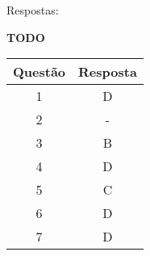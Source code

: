 \documentclass[12pt]{article}
\begin{document}
Respostas:

\textbf{TODO}

\begin{table}[H]
      \begin{tabular}{|c|c|} \hline
      \textbf{Questão} & \textbf{Resposta}\\
      \hline
      1  & D \\ \hline
      2  & - \\ \hline
      3  & B \\ \hline
      4  & D \\ \hline
      5  & C \\ \hline
      6  & D \\ \hline
      7  & D \\ \hline
      \end{tabular}
\end{table}
\end{document}
